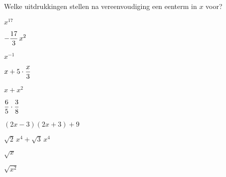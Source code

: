 \documentclass{ximera}
\begin{document}
	\author{Koen De Naeghel - Wiskunde Op Maat}
	\xmsource
	\label{xim:veeltermen_basisbegrippen_oefeningen_reeks1}


\begin{exercise}
Welke uitdrukkingen stellen na vereenvoudiging een eenterm in $x$ voor? 
\renewcommand{\TJa }{\makebox[2.5cm]{Een eenterm }}
\renewcommand{\TNee}{\makebox[2.5cm]{Geen eenterm}}

\begin{multicols}{2}
	\begin{question} \choiceYes  \( x^{17}                         \)   \end{question}
	\begin{question} \choiceYes  \( \displaystyle -\frac{17}{3}\,x^2          \)   \end{question}
	\begin{question} \choiceNo   \( x^{-1}                         \)   \end{question}
	\begin{question} \choiceYes  \( \displaystyle x + 5\cdot \frac{x}{3}      \)   \end{question}
	\begin{question} \choiceNo   \( x + x^2                        \)   \end{question}
	\begin{question} \choiceYes  \( \displaystyle \frac{6}{5}\cdot\frac{3}{8} \)   \end{question}
	\begin{question} \choiceYes  \( (2x-3)(2x+3)+9                 \)   \end{question}
	\begin{question} \choiceYes  \( \sqrt{2}\,x^4 + \sqrt{3}\,x^4  \)   \end{question}
	\begin{question} \choiceNo   \( \sqrt{x}                       \)   \end{question}
	\begin{question} \choiceNo   \( \sqrt{x^2}                     \)   \end{question}
\end{multicols}
\end{exercise}
\end{document}
